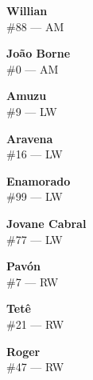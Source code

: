 \documentclass[11pt]{article}
\begin{document}
\begin{minipage}[t]{0.30\textwidth}
\centering
\textbf{Willian}\\
\#88 --- AM\\
\vspace{0.2cm}
\end{minipage}
\hfill
\begin{minipage}[t]{0.30\textwidth}
\centering
\textbf{João Borne}\\
\#0 --- AM\\
\vspace{0.2cm}
\end{minipage}
\hfill
\begin{minipage}[t]{0.30\textwidth}
\centering
\textbf{Amuzu}\\
\#9 --- LW\\
\vspace{0.2cm}
\end{minipage}
\vspace{0.5cm}

\begin{minipage}[t]{0.30\textwidth}
\centering
\textbf{Aravena}\\
\#16 --- LW\\
\vspace{0.2cm}
\end{minipage}
\hfill
\begin{minipage}[t]{0.30\textwidth}
\centering
\textbf{Enamorado}\\
\#99 --- LW\\
\vspace{0.2cm}
\end{minipage}
\hfill
\begin{minipage}[t]{0.30\textwidth}
\centering
\textbf{Jovane Cabral}\\
\#77 --- LW\\
\vspace{0.2cm}
\end{minipage}
\vspace{0.5cm}

\begin{minipage}[t]{0.30\textwidth}
\centering
\textbf{Pavón}\\
\#7 --- RW\\
\vspace{0.2cm}
\end{minipage}
\hfill
\begin{minipage}[t]{0.30\textwidth}
\centering
\textbf{Tetê}\\
\#21 --- RW\\
\vspace{0.2cm}
\end{minipage}
\hfill
\begin{minipage}[t]{0.30\textwidth}
\centering
\textbf{Roger}\\
\#47 --- RW\\
\vspace{0.2cm}
\end{minipage}
\vspace{0.5cm}
\end{document}
